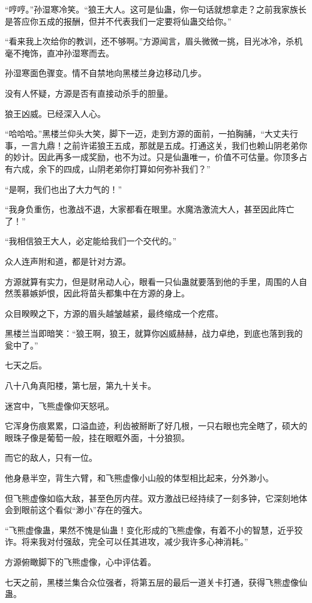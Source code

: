 \begin{this_body}
“哼哼。”孙湿寒冷笑。“狼王大人。这可是仙蛊，你一句话就想拿走？之前我家族长是答应你五成的报酬，但并不代表我们一定要将仙蛊交给你。”

“看来我上次给你的教训，还不够啊。”方源闻言，眉头微微一挑，目光冰冷，杀机毫不掩饰，直冲孙湿寒而去。

孙湿寒面色骤变。情不自禁地向黑楼兰身边移动几步。

没有人怀疑，方源是否有直接动杀手的胆量。

狼王凶威。已经深入人心。

“哈哈哈。”黑楼兰仰头大笑，脚下一迈，走到方源的面前，一拍胸脯，“大丈夫行事，一言九鼎！之前许诺狼王五成，那就是五成。打通这关，我们也赖山阴老弟你的妙计。因此再多一成奖励，也不为过。只是仙蛊唯一，价值不可估量。你顶多占有六成，余下的四成，山阴老弟你打算如何弥补我们？”

“是啊，我们也出了大力气的！”

“我身负重伤，也激战不退，大家都看在眼里。水魔浩激流大人，甚至因此阵亡了！”

“我相信狼王大人，必定能给我们一个交代的。”

众人连声附和道，都是针对方源。

方源就算有实力，但是财帛动人心，眼看一只仙蛊就要落到他的手里，周围的人自然羡慕嫉妒恨，因此将苗头都集中在方源的身上。

众目睽睽之下，方源的眉头越皱越紧，最终缩成一个疙瘩。

黑楼兰当即暗笑：“狼王啊，狼王，就算你凶威赫赫，战力卓绝，到底也落到我的瓮中了。”

七天之后。

八十八角真阳楼，第七层，第九十关卡。

迷宫中，飞熊虚像仰天怒吼。

它浑身伤痕累累，口溢血迹，利齿被掰断了好几根，一只右眼也完全瞎了，硕大的眼珠子像是葡萄一般，挂在眼眶外面，十分狼狈。

而它的敌人，只有一位。

他身悬半空，背生六臂，和飞熊虚像小山般的体型相比起来，分外渺小。

但飞熊虚像如临大敌，甚至色厉内荏。双方激战已经持续了一刻多钟，它深刻地体会到眼前这个看似“渺小”存在的强大。

“飞熊虚像蛊，果然不愧是仙蛊！变化形成的飞熊虚像，有着不小的智慧，近乎狡诈。将来我对付强敌，完全可以任其进攻，减少我许多心神消耗。”

方源俯瞰脚下的飞熊虚像，心中评估着。

七天之前，黑楼兰集合众位强者，将第五层的最后一道关卡打通，获得飞熊虚像仙蛊。


\end{this_body}
